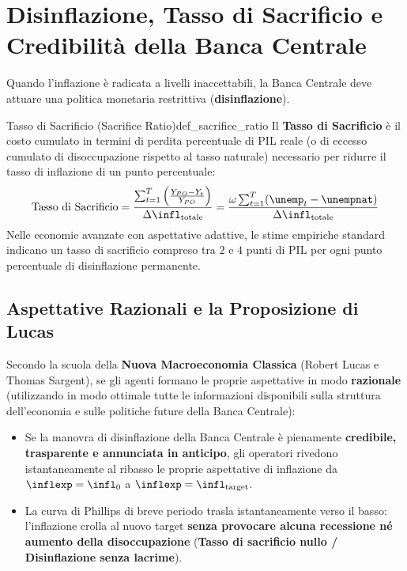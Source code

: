 \section{Disinflazione, Tasso di Sacrificio e Credibilità della Banca Centrale}

Quando l'inflazione è radicata a livelli inaccettabili, la Banca Centrale deve attuare una politica monetaria restrittiva (\textbf{disinflazione}).

\begin{definizione}{Tasso di Sacrificio (Sacrifice Ratio)}{def_sacrifice_ratio}
Il \textbf{Tasso di Sacrificio} è il costo cumulato in termini di perdita percentuale di PIL reale (o di eccesso cumulato di disoccupazione rispetto al tasso naturale) necessario per ridurre il tasso di inflazione di un punto percentuale:
\begin{equation}
    \text{Tasso di Sacrificio} = \frac{\sum_{t=1}^T \Big( \frac{Y_{PO} - Y_t}{Y_{PO}} \Big)}{\Delta \infl_{\text{totale}}} = \frac{\omega \sum_{t=1}^T (\unemp_t - \unempnat)}{\Delta \infl_{\text{totale}}}
\end{equation}
Nelle economie avanzate con aspettative adattive, le stime empiriche standard indicano un tasso di sacrificio compreso tra $2$ e $4$ punti di PIL per ogni punto percentuale di disinflazione permanente.
\end{definizione}

\subsection{Aspettative Razionali e la Proposizione di Lucas}
Secondo la scuola della \textbf{Nuova Macroeconomia Classica} (Robert Lucas e Thomas Sargent), se gli agenti formano le proprie aspettative in modo \textbf{razionale} (utilizzando in modo ottimale tutte le informazioni disponibili sulla struttura dell'economia e sulle politiche future della Banca Centrale):
\begin{itemize}
    \item Se la manovra di disinflazione della Banca Centrale è pienamente \textbf{credibile, trasparente e annunciata in anticipo}, gli operatori rivedono istantaneamente al ribasso le proprie aspettative di inflazione da $\inflexp = \infl_0$ a $\inflexp = \infl_{\text{target}}$.
    \item La curva di Phillips di breve periodo trasla istantaneamente verso il basso: l'inflazione crolla al nuovo target \textbf{senza provocare alcuna recessione né aumento della disoccupazione} (\textbf{Tasso di sacrificio nullo / Disinflazione senza lacrime}).
\end{itemize}


